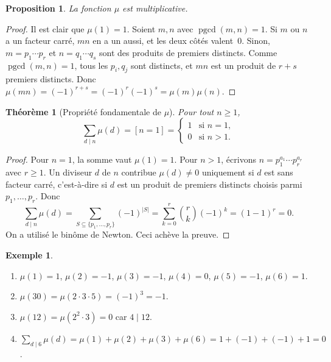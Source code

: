\documentclass[12pt,a4paper,openany]{book}
\theoremstyle{definition}
\newtheorem{exemple}[definition]{Exemple}
\theoremstyle{plain}
\newtheorem{theoreme}[definition]{Théorème}
\newtheorem{proposition}[definition]{Proposition}
\theoremstyle{remark}
\newcommand{\abs}[1]{\left|#1\right|}
\DeclareMathOperator{\pgcd}{pgcd}
\begin{document}
\begin{proposition}
\label{prop:mu-multiplicative}
La fonction $\mu$ est multiplicative.
\end{proposition}

\begin{proof}
Il est clair que $\mu(1) = 1$. Soient $m, n$ avec $\pgcd(m,n) = 1$. Si $m$ ou $n$ a un
facteur carré, $mn$ en a un aussi, et les deux côtés valent~$0$. Sinon,
$m = p_1 \cdots p_r$ et $n = q_1 \cdots q_s$ sont des produits de premiers distincts.
Comme $\pgcd(m,n)=1$, tous les $p_i, q_j$ sont distincts, et $mn$ est un produit de
$r+s$ premiers distincts. Donc $\mu(mn) = (-1)^{r+s} = (-1)^r(-1)^s = \mu(m)\mu(n)$.
\end{proof}

\begin{theoreme}[Propriété fondamentale de $\mu$]
\label{thm:mu-propriete-fondamentale}
Pour tout $n \geq 1$,
\[
  \sum_{d \mid n} \mu(d) = [n = 1] =
  \begin{cases} 1 & \text{si } n = 1, \\ 0 & \text{si } n > 1. \end{cases}
\]
\end{theoreme}

\begin{proof}
Pour $n = 1$, la somme vaut $\mu(1) = 1$. Pour $n > 1$, écrivons
$n = p_1^{a_1} \cdots p_r^{a_r}$ avec $r \geq 1$. Un diviseur $d$ de $n$ contribue
$\mu(d) \neq 0$ uniquement si $d$ est sans facteur carré, c'est-à-dire si $d$ est un
produit de premiers distincts choisis parmi $p_1, \ldots, p_r$. Donc
\[
  \sum_{d \mid n} \mu(d) = \sum_{S \subseteq \{p_1, \ldots, p_r\}} (-1)^{\abs{S}}
    = \sum_{k=0}^{r} \binom{r}{k} (-1)^k = (1 - 1)^r = 0.
\]
On a utilisé le binôme de Newton. Ceci achève la preuve.
\end{proof}

\begin{exemple}
\label{ex:mu-calculs}
\begin{enumerate}[label=(\alph*)]
  \item $\mu(1)=1$, $\mu(2)=-1$, $\mu(3)=-1$, $\mu(4)=0$, $\mu(5)=-1$, $\mu(6)=1$.
  \item $\mu(30) = \mu(2 \cdot 3 \cdot 5) = (-1)^3 = -1$.
  \item $\mu(12) = \mu(2^2 \cdot 3) = 0$ car $4 \mid 12$.
  \item $\sum_{d \mid 6} \mu(d) = \mu(1) + \mu(2) + \mu(3) + \mu(6)
    = 1 + (-1) + (-1) + 1 = 0$. \checkmark
\end{enumerate}
\end{exemple}
\end{document}
